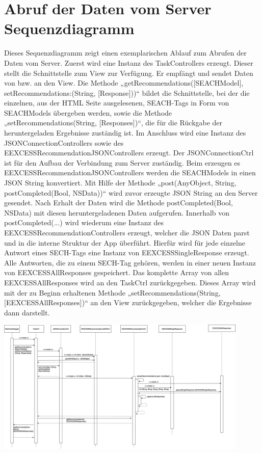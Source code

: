 \section{Abruf der Daten vom Server Sequenzdiagramm}

Dieses Sequenzdiagramm zeigt einen exemplarischen Ablauf zum Abrufen der Daten vom Server. Zuerst wird eine Instanz des TaskControllers erzeugt. Dieser stellt die Schnittstelle zum View zur Verfügung. Er empfängt und sendet Daten von bzw. an den View. Die Methode „getRecommendations([SEACHModel], setRecommendations:(String, [Response]))“ bildet die Schnittstelle, bei der die einzelnen, aus der HTML Seite ausgelesenen, SEACH-Tags in Form von SEACHModels übergeben werden, sowie die Methode „setRecommendations(String, [Responses])“, die für die Rückgabe der heruntergeladen Ergebnisse zuständig ist. Im Anschluss wird eine Instanz des JSONConnectionControllers sowie des EEXCESSRecommendationJSONControllers erzeugt. Der JSONConnectionCtrl ist für den Aufbau der Verbindung zum Server zuständig. Beim erzeugen es EEXCESSRecommendationJSONControllers werden die SEACHModels in einen JSON String konvertiert. Mit Hilfe der Methode „post(AnyObject, String, postCompleted(Bool, NSData))“ wird zuvor erzeugte JSON String an den Server gesendet. Nach Erhalt der Daten wird die Methode postCompleted(Bool, NSData) mit diesen heruntergeladenen Daten aufgerufen. Innerhalb von 
postCompleted(...) wird wiederum eine Instanz des EEXCESSRecommendationControllers erzeugt, welcher die JSON Daten parst und in die interne Struktur der App überführt. Hierfür wird für jede einzelne Antwort eines SECH-Tags eine Instanz von EEXCESSSingleResponse erzeugt. Alle Antworten, die zu einem SECH-Tag gehören, werden in einer neuen Instanz von EEXCESSAllResponses gespeichert.  Das komplette Array von allen EEXCESSAllResponses wird an den TaskCtrl zurückgegeben. Dieses Array wird mit der zu Beginn erhaltenen Methode „setRecommendations(String, [EEXCESSAllResponses])“ an den View zurückgegeben, welcher die Ergebnisse dann darstellt. 

\includegraphics[width=12cm]{Pics/Sequenzdiagramm_Anfragen}


